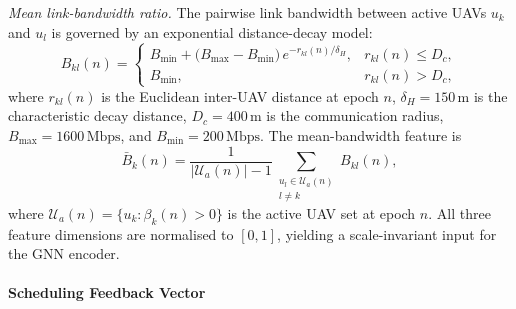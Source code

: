\textit{Mean link-bandwidth ratio.}
The pairwise link bandwidth between active UAVs $u_k$ and $u_l$ is
governed by an exponential distance-decay model:
\begin{equation}
  B_{kl}(n) =
  \begin{cases}
    B_{\min} + \bigl(B_{\max} - B_{\min}\bigr)\,
      e^{-r_{kl}(n)/\delta_H},
      & r_{kl}(n) \leq D_c, \\
    B_{\min},
      & r_{kl}(n) > D_c,
  \end{cases}
  \label{eq:bw_model}
\end{equation}
where $r_{kl}(n)$ is the Euclidean inter-UAV distance at epoch $n$,
$\delta_H = 150\,\text{m}$ is the characteristic decay distance,
$D_c = 400\,\text{m}$ is the communication radius,
$B_{\max} = 1600\,\text{Mbps}$, and $B_{\min} = 200\,\text{Mbps}$.
The mean-bandwidth feature is
\begin{equation}
  \bar{B}_k(n) =
  \frac{1}{|\mathcal{U}_a(n)| - 1}
  \sum_{\substack{u_l \in \mathcal{U}_a(n) \\ l \neq k}}
  B_{kl}(n),
  \label{eq:avg_bw}
\end{equation}
where $\mathcal{U}_a(n) = \{u_k : \beta_k(n) > 0\}$ is the active
UAV set at epoch $n$.
All three feature dimensions are normalised to $[0,1]$,
yielding a scale-invariant input for the GNN encoder.

\paragraph{Scheduling Feedback Vector}

